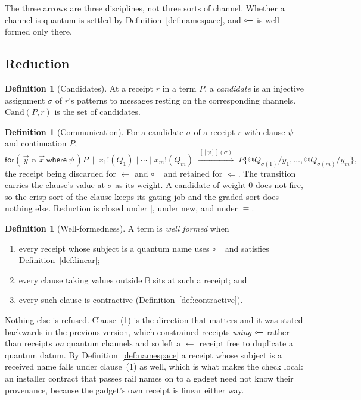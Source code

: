 \documentclass[11pt,a4paper]{article}
\theoremstyle{plain}
\theoremstyle{definition}
\newtheorem{definition}[theorem]{Definition}
\theoremstyle{remark}
\newcommand{\sem}[1]{[\![#1]\!]}
\newcommand{\Bool}{\mathbb{B}}
\newcommand{\scong}{\equiv}
\newcommand{\Cand}{\mathrm{Cand}}
\newcommand{\lolli}{\mathrel{\reflectbox{$\multimap$}}}
\begin{document}
The three arrows are three disciplines, not three sorts of channel. Whether a
channel is quantum is settled by Definition~\ref{def:namespace}, and
$\lolli$ is well formed only there.

\subsection{Reduction}

\begin{definition}[Candidates]\label{def:candsite}
At a receipt $r$ in a term $P$, a \emph{candidate} is an injective assignment
$\sigma$ of $r$'s patterns to messages resting on the corresponding channels.
$\Cand(P,r)$ is the set of candidates.
\end{definition}

\begin{definition}[Communication]\label{def:comm}
For a candidate $\sigma$ of a receipt $r$ with clause $\psi$ and continuation
$P$,
\[
  \textsf{for}(\,\vec{y} \mathbin{\alpha} \vec{x}\ \textsf{where}\ \psi\,)P
  \ \mid\ x_1!(Q_1) \mid \cdots \mid x_m!(Q_m)
  \;\xrightarrow{\ \sem{\psi}(\sigma)\ }\;
  P\{@Q_{\sigma(1)}/y_1,\dots,@Q_{\sigma(m)}/y_m\},
\]
the receipt being discarded for $\leftarrow$ and $\lolli$ and retained for
$\Leftarrow$. The transition carries the clause's value at $\sigma$ as its
weight. A candidate of weight $0$ does not fire, so the crisp sort of the clause
keeps its gating job and the graded sort does nothing else. Reduction is closed
under $\mid$, under \textsf{new}, and under $\scong$.
\end{definition}

\begin{definition}[Well-formedness]\label{def:wf}
A term is \emph{well formed} when
\begin{enumerate}[leftmargin=1.6em,itemsep=1pt,topsep=2pt]
\item every receipt whose subject is a quantum name uses $\lolli$ and satisfies
      Definition~\ref{def:linear};
\item every clause taking values outside $\Bool$ sits at such a receipt; and
\item every such clause is contractive (Definition~\ref{def:contractive}).
\end{enumerate}
Nothing else is refused. Clause~(1) is the direction that matters and it was
stated backwards in the previous version, which constrained receipts
\emph{using} $\lolli$ rather than receipts \emph{on} quantum channels and so
left a $\leftarrow$ receipt free to duplicate a quantum datum. By
Definition~\ref{def:namespace} a receipt whose subject is a received name falls
under clause~(1) as well, which is what makes the check local: an installer
contract that passes rail names on to a gadget need not know their provenance,
because the gadget's own receipt is linear either way.
\end{definition}
\end{document}
